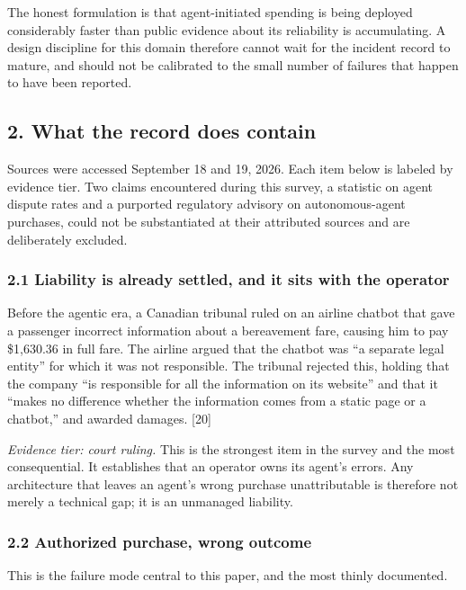 \documentclass[
  11pt,
  letterpaper,
]{article}
\begin{document}
The honest formulation is that agent-initiated spending is being
deployed considerably faster than public evidence about its reliability
is accumulating. A design discipline for this domain therefore cannot
wait for the incident record to mature, and should not be calibrated to
the small number of failures that happen to have been reported.

\subsection{2. What the record does
contain}\label{what-the-record-does-contain}

Sources were accessed September 18 and 19, 2026. Each item below is
labeled by evidence tier. Two claims encountered during this survey, a
statistic on agent dispute rates and a purported regulatory advisory on
autonomous-agent purchases, could not be substantiated at their
attributed sources and are deliberately excluded.

\subsubsection{2.1 Liability is already settled, and it sits with the
operator}\label{liability-is-already-settled-and-it-sits-with-the-operator}

Before the agentic era, a Canadian tribunal ruled on an airline chatbot
that gave a passenger incorrect information about a bereavement fare,
causing him to pay \$1,630.36 in full fare. The airline argued that the
chatbot was ``a separate legal entity'' for which it was not
responsible. The tribunal rejected this, holding that the company ``is
responsible for all the information on its website'' and that it ``makes
no difference whether the information comes from a static page or a
chatbot,'' and awarded damages. {[}20{]}

\emph{Evidence tier: court ruling.} This is the strongest item in the
survey and the most consequential. It establishes that an operator owns
its agent's errors. Any architecture that leaves an agent's wrong
purchase unattributable is therefore not merely a technical gap; it is
an unmanaged liability.

\subsubsection{2.2 Authorized purchase, wrong
outcome}\label{authorized-purchase-wrong-outcome}

This is the failure mode central to this paper, and the most thinly
documented.
\end{document}
